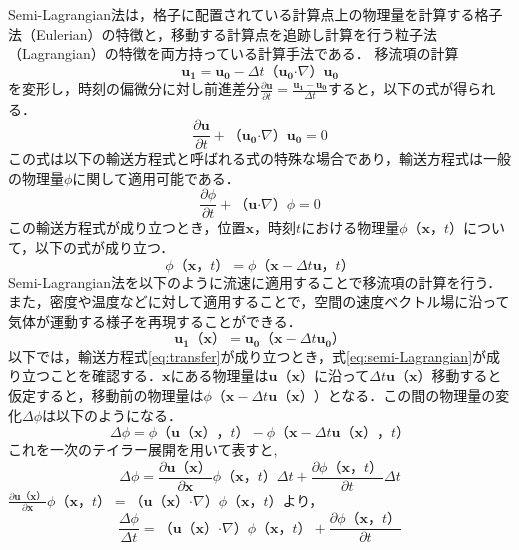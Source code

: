 \documentclass[a4j,12pt]{jreport}
\begin{document}
Semi-Lagrangian法は，格子に配置されている計算点上の物理量を計算する格子法（Eulerian）の特徴と，移動する計算点を追跡し計算を行う粒子法（Lagrangian）の特徴を両方持っている計算手法である．
移流項の計算$$\bm{u_1} = \bm{u_0}  - \varDelta t （\bm{u_0}  \boldsymbol{\cdot}\nabla） \bm{u_0}$$を変形し，時刻の偏微分に対し前進差分$\frac{\partial \bm{u}}{\partial t} = \frac{\bm{u_1} - \bm{u_0}}{ \varDelta t }$すると，以下の式が得られる．
\[
\frac{\partial \bm{u}}{\partial t}   +（\bm{u_0}  \boldsymbol{\cdot}\nabla） \bm{u_0} = 0
\]
この式は以下の輸送方程式と呼ばれる式の特殊な場合であり，輸送方程式は一般の物理量$\phi$に関して適用可能である．
\begin{equation}\label{eq:transfer}
	\frac{\partial {\phi}}{\partial t}  +（\bm{u}  \boldsymbol{\cdot}\nabla） {\phi} = 0
\end{equation} 
この輸送方程式が成り立つとき，位置$\bm{x}$，時刻$t$における物理量$\phi（\bm{x}，t）$について，以下の式が成り立つ．
\begin{equation}\label{eq:semi-Lagrangian}
	{\phi}（\bm{x}，t） = {\phi}（\bm{x}  - \varDelta t \bm{u}，t）
\end{equation} 
Semi-Lagrangian法を以下のように流速に適用することで移流項の計算を行う．また，密度や温度などに対して適用することで，空間の速度ベクトル場に沿って気体が運動する様子を再現することができる．
\[
	\bm{u_1}（\bm{x}） = \bm{u_0}（\bm{x}  - \varDelta t \bm{u_0}）
\]
以下では，輸送方程式\ref{eq:transfer}が成り立つとき，式\ref{eq:semi-Lagrangian}が成り立つことを確認する．$\bm{x}$にある物理量は$\bm{u} （\bm{x}） $に沿って$\varDelta t\bm{u} （\bm{x}）$移動すると仮定すると，移動前の物理量は$\phi（\bm{x} -  \varDelta t\bm{u} （\bm{x}））$となる．この間の物理量の変化$\varDelta {\phi}$は以下のようになる．
\[
\varDelta \phi = \phi（ \bm{u} （\bm{x}），t） - \phi （\bm{x} - \varDelta t\bm{u} （\bm{x}），t）
\]
これを一次のテイラー展開を用いて表すと,
\[
\varDelta \phi   = \frac{\partial \bm{u} （\bm{x}） }{\partial \bm{x}}\phi （\bm{x}，t） \varDelta t + \frac{\partial \phi （\bm{x}，t） }{\partial t}\varDelta t
\]
$\frac{\partial \bm{u} （\bm{x}） }{\partial \bm{x}}\phi （\bm{x}，t）= （\bm{u}（\bm{x}） \boldsymbol{\cdot}\nabla）\phi（\bm{x}，t）$より，
\[
 \frac{\varDelta \phi}{\varDelta t} =  （\bm{u}（\bm{x}）\boldsymbol{\cdot}\nabla） \phi（\bm{x}，t） + \frac{\partial \phi（\bm{x}，t） }{\partial t}
 \]
 
\end{document}
